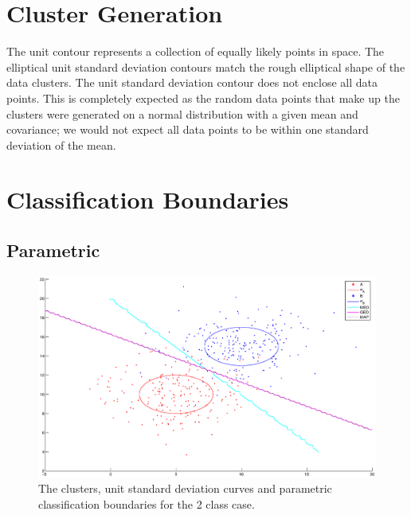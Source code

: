 \section{Cluster Generation}
The unit contour represents a collection of equally likely points in space. 
The elliptical unit standard deviation contours match the rough elliptical 
shape of the data clusters. The unit standard deviation contour does not 
enclose all data points.  This is completely expected as the random data 
points that make up the clusters were generated on a normal distribution with 
a given mean and covariance; we would not expect all data points to be within 
one standard deviation of the mean.

\section{Classification Boundaries}

\subsection{Parametric}

\begin{figure}
  \begin{center}
  	\label{fig:2param}  
    \caption{The clusters, unit standard deviation curves and
    parametric classification boundaries for the 2 class case.}
    \includegraphics[width=15cm]{figures/2-param}
  \end{center}
\end{figure}

